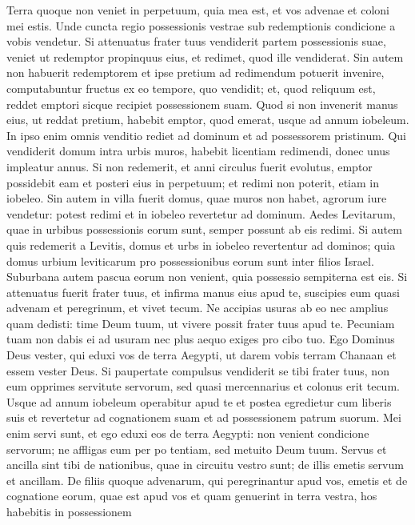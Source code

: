 \begin{biblechapter}
\verse Terra quoque non veniet in perpetuum, quia mea est, et vos advenae et coloni mei estis. 
\verse Unde cuncta regio possessionis vestrae sub redemptionis condicione a vobis vendetur. 
\verse Si attenuatus frater tuus vendiderit partem possessionis suae, veniet ut redemptor propinquus eius, et redimet, quod ille vendiderat. 
\verse Sin autem non habuerit redemptorem et ipse pretium ad redimendum potuerit invenire, 
\verse computabuntur fructus ex eo tempore, quo vendidit; et, quod reliquum est, reddet emptori sicque recipiet possessionem suam. 
\verse Quod si non invenerit manus eius, ut reddat pretium, habebit emptor, quod emerat, usque ad annum iobeleum. In ipso enim omnis venditio rediet ad dominum et ad possessorem pristinum. 
\verse Qui vendiderit domum intra urbis muros, habebit licentiam redimendi, donec unus impleatur annus. 
\verse Si non redemerit, et anni circulus fuerit evolutus, emptor possidebit eam et posteri eius in perpetuum; et redimi non poterit, etiam in iobeleo. 
\verse Sin autem in villa fuerit domus, quae muros non habet, agrorum iure vendetur: potest redimi et in iobeleo revertetur ad dominum. 
\verse Aedes Levitarum, quae in urbibus possessionis eorum sunt, semper possunt ab eis redimi. 
\verse Si autem quis redemerit a Levitis, domus et urbs in iobeleo revertentur ad dominos; quia domus urbium leviticarum pro possessionibus eorum sunt inter filios Israel. 
\verse Suburbana autem pascua eorum non venient, quia possessio sempiterna est eis. 
\verse Si attenuatus fuerit frater tuus, et infirma manus eius apud te, suscipies eum quasi advenam et peregrinum, et vivet tecum. 
\verse Ne accipias usuras ab eo nec amplius quam dedisti: time Deum tuum, ut vivere possit frater tuus apud te.  
\verse Pecuniam tuam non dabis ei ad usuram nec plus aequo exiges pro cibo tuo.  
\verse Ego Dominus Deus vester, qui eduxi vos de terra Aegypti, ut darem vobis terram Chanaan et essem vester Deus. 
\verse Si paupertate compulsus vendiderit se tibi frater tuus, non eum opprimes servitute servorum, 
\verse sed quasi mercennarius et colonus erit tecum. Usque ad annum iobeleum operabitur apud te 
\verse et postea egredietur cum liberis suis et revertetur ad cognationem suam et ad possessionem patrum suorum. 
\verse Mei enim servi sunt, et ego eduxi eos de terra Aegypti: non venient condicione servorum; 
\verse ne affligas eum per po tentiam, sed metuito Deum tuum. 
\verse Servus et ancilla sint tibi de nationibus, quae in circuitu vestro sunt; de illis emetis servum et ancillam. 
\verse De filiis quoque advenarum, qui peregrinantur apud vos, emetis et de cognatione eorum, quae est apud vos et quam genuerint in terra vestra, hos habebitis in possessionem 

\end{biblechapter}
